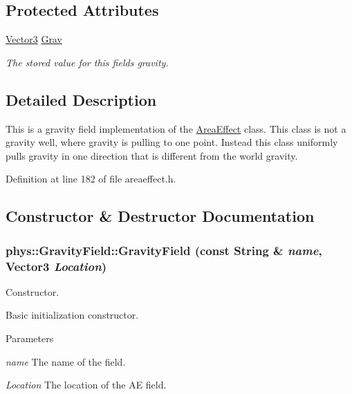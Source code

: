 \subsection*{Protected Attributes}
\begin{DoxyCompactItemize}
\item 
\hypertarget{classphys_1_1GravityField_a14084e696d0848db88b4a91413245849}{
\hyperlink{classphys_1_1Vector3}{Vector3} \hyperlink{classphys_1_1GravityField_a14084e696d0848db88b4a91413245849}{Grav}}
\label{d4/d8a/classphys_1_1GravityField_a14084e696d0848db88b4a91413245849}

\begin{DoxyCompactList}\small\item\em The stored value for this fields gravity. \item\end{DoxyCompactList}\end{DoxyCompactItemize}


\subsection{Detailed Description}
This is a gravity field implementation of the \hyperlink{classphys_1_1AreaEffect}{AreaEffect} class. This class is not a gravity well, where gravity is pulling to one point. Instead this class uniformly pulls gravity in one direction that is different from the world gravity. 

Definition at line 182 of file areaeffect.h.



\subsection{Constructor \& Destructor Documentation}
\hypertarget{classphys_1_1GravityField_a9093176e954b4c631d0757a553971cfd}{
\subsubsection[{GravityField}]{\setlength{\rightskip}{0pt plus 5cm}phys::GravityField::GravityField (const {\bf String} \& {\em name}, \/  {\bf Vector3} {\em Location})}}
\label{d4/d8a/classphys_1_1GravityField_a9093176e954b4c631d0757a553971cfd}


Constructor. 

Basic initialization constructor. 
\begin{DoxyParams}{Parameters}
\item[{\em name}]The name of the field. \item[{\em Location}]The location of the AE field. \end{DoxyParams}


